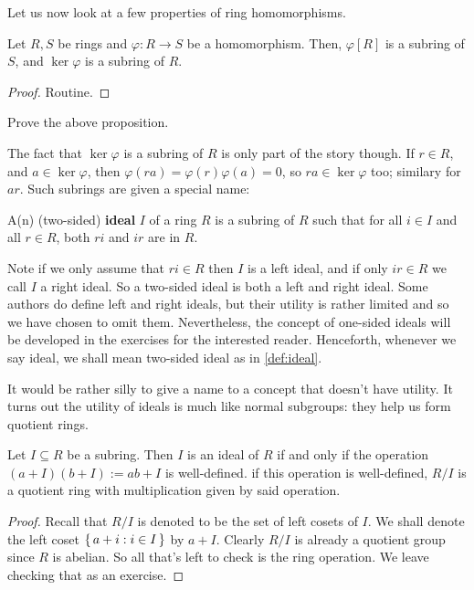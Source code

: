 \documentclass[./main.tex]{subfiles}
\begin{document}
Let us now look at a few properties of ring homomorphisms. 

\begin{proposition}
    Let $R, S$ be rings and $\varphi: R \to S$ be a homomorphism. Then,
    $\varphi[R]$ is a subring of $S$, and $\ker \varphi$ is a subring of $R$. 
\end{proposition}
\begin{proof}
    Routine.
\end{proof}
\begin{exercise}
    Prove the above proposition.
\end{exercise}

The fact that $\ker \varphi$ is a subring of $R$ is only part of the story
though. If $r \in R$, and $a \in \ker \varphi$, then $\varphi(ra) = \varphi(r)
\varphi(a) = 0$, so $ra \in \ker \varphi$ too; similary for $ar$. Such subrings
are given a special name:

\begin{definition}[Ideal]
\label{def:ideal}
    A(n) (two-sided) \textbf{ideal} $I$ of a ring $R$ is a subring of $R$ such
    that for all $i \in I$ and all $r \in R$, both $ri$ and $ir$ are in $R$.
\end{definition}

Note if we only assume that $ri \in R$ then $I$ is a left ideal, and if only $ir
\in R$ we call $I$ a right ideal. So a two-sided ideal is both a left and right
ideal. Some authors do define left and right ideals, but their utility is rather
limited and so we have chosen to omit them. Nevertheless, the concept of
one-sided ideals will be developed in the exercises for the interested reader.
Henceforth, whenever we say ideal, we shall mean two-sided ideal as in
\cref{def:ideal}.

It would be rather silly to give a name to a concept that doesn't have utility.
It turns out the utility of ideals is much like normal subgroups: they help us
form quotient rings. 

\begin{proposition}
\label{prop:existence-of-quotient-rings}
    Let $I \subseteq R$ be a subring. Then $I$ is an ideal of $R$ if and only if
    the operation $(a + I)(b + I) := ab + I$ is well-defined. if this operation
    is well-defined, $R/I$ is a quotient ring with multiplication given by said
    operation.
\end{proposition}


\begin{proof}
    Recall that $R/I$ is denoted to be the set of left cosets of $I$. We shall
    denote the left coset $\set{a + i: i \in I}$ by $a + I$. Clearly $R/I$ is
    already a quotient group since $R$ is abelian. So all that's left to check is
    the ring operation. We leave checking that as an exercise.
\end{proof}
\end{document}

